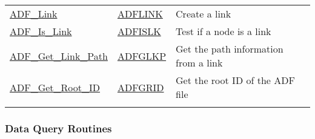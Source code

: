 \begin{longtable}{>{\ttfamily}l >{\ttfamily}l >{\raggedright\arraybackslash}p{\Pwidth} c}
\hyperlink{sub:Link}{ADF\_Link} &
   \hyperlink{sub:Link}{ADFLINK} &
   Create a link &
   \pageref*{sub:Link} \\
\hyperlink{sub:Is\_Link}{ADF\_Is\_Link} &
   \hyperlink{sub:Is\_Link}{ADFISLK} &
   Test if a node is a link &
   \pageref*{sub:Is_Link} \\
\hyperlink{sub:Get\_Link\_Path}{ADF\_Get\_Link\_Path} &
   \hyperlink{sub:Get\_Link\_Path}{ADFGLKP} &
   Get the path information from a link &
   \pageref*{sub:Get_Link_Path} \\
\hyperlink{sub:Get\_Root\_ID}{ADF\_Get\_Root\_ID} &
   \hyperlink{sub:Get\_Root\_ID}{ADFGRID} &
   Get the root ID of the ADF file &
   \pageref*{sub:Get_Root_ID}
\\*[1ex] \hline\hline
\end{longtable}

\newpage
\subsubsection*{Data Query Routines}

